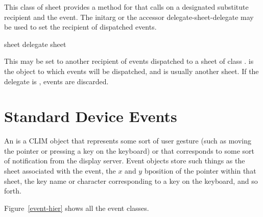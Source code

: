
This class of sheet provides a method for  that calls
 on a designated substitute recipient and the event.  The
initarg  or the accessor {delegate-sheet-delegate} may be used to
set the recipient of dispatched events.

 {sheet}
 {delegate sheet}

This may be set to another recipient of events dispatched to a sheet of class
.   is the object to which events
will be dispatched, and is usually another sheet.  If the delegate is ,
events are discarded.




\section {Standard Device Events}

An  is a CLIM object that represents some sort of user gesture
(such as moving the pointer or pressing a key on the keyboard) or that
corresponds to some sort of notification from the display server.  Event objects
store such things as the sheet associated with the event, the $x$ and $y$
bposition of the pointer within that sheet, the key name or character
corresponding to a key on the keyboard, and so forth.

Figure~\ref{event-hier} shows all the event classes.

